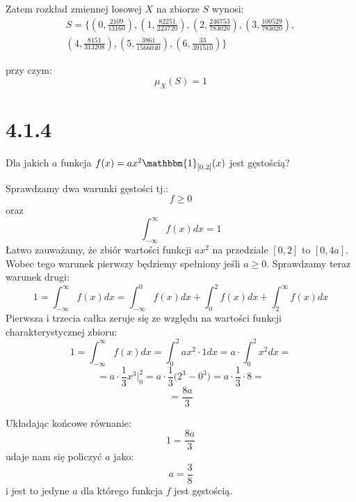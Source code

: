 \documentclass{article}
\begin{document}
Zatem rozkład zmiennej losowej \(X\) na zbiorze \(S\) wynosi:
\begin{align*} 
    S = \Big\{(0, \frac{2109}{13160}), (1, \frac{82251}{223720}), (2, \frac{246753}{783020}), (3, \frac{100529}{783020}), \\
             (4, \frac{8151}{313208}), (5, \frac{3861}{1566040}), (6, \frac{33}{391510})\Big\}
\end{align*}

przy czym:
\begin{equation*}
    \mu_{X}(S) = 1
\end{equation*}

\section*{4.1.4}

\begin{center}
    Dla jakich \(a\) funkcja \(f(x) = ax^{2}\mathbbm{1}_{[0,2]}(x)\) jest gęstością?
\end{center}

Sprawdzamy dwa warunki gęstości tj.:
\begin{equation*}
    f \geq 0
\end{equation*}
oraz
\begin{equation*}
    \int_{-\infty}^{\infty} f(x)dx = 1
\end{equation*}
Łatwo zauważamy, że zbiór wartości funkcji \(ax^2\) na przedziale \([0,2]\) to \([0, 4a]\).
Wobec tego warunek pierwszy będziemy spełniony jeśli \(a \geq 0\). Sprawdzamy teraz warunek drugi:
\begin{equation*}
    1 = \int_{-\infty}^{\infty} f(x)dx = \int_{-\infty}^{0} f(x)dx + \int_{0}^{2} f(x)dx + \int_{2}^{\infty} f(x)dx
\end{equation*}
Pierwsza i trzecia całka zeruje się ze względu na wartości funkcji charakterystycznej zbioru:
\begin{equation*}
    1 = \int_{-\infty}^{\infty} f(x)dx = \int_{0}^{2} ax^{2} \cdot 1 dx = a \cdot \int_{0}^{2} x^{2} dx = 
\end{equation*}
\begin{equation*}
    = a \cdot \frac{1}{3}x^{3} \Bigg\rvert_{0}^{2} = a \cdot \frac{1}{3}\Bigg(2^{3} - 0^{3}\Bigg) = a \cdot \frac{1}{3} \cdot 8 =
\end{equation*}
\begin{equation*}
    = \frac{8a}{3}
\end{equation*}

Układając końcowe równanie:
\begin{equation*}
    1 = \frac{8a}{3}
\end{equation*}
udaje nam się policzyć \(a\) jako:
\begin{equation*}
    a = \frac{3}{8}
\end{equation*}
i jest to jedyne \(a\) dla którego funkcja \(f\) jest gęstością.
\end{document}
